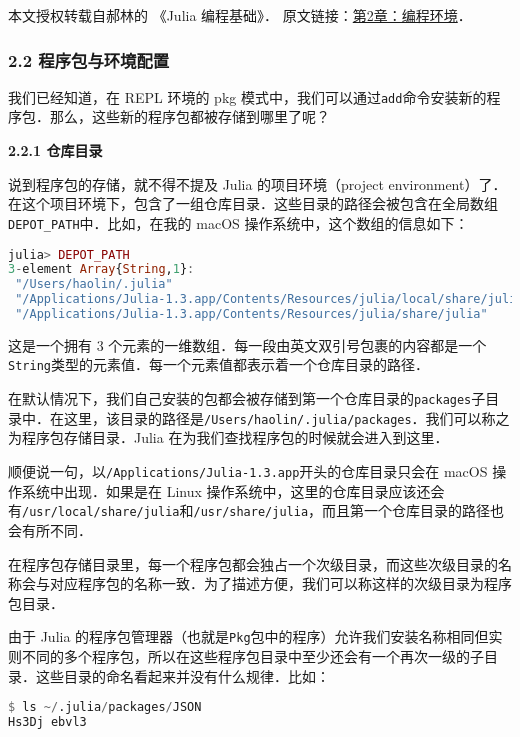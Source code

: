 
本文授权转载自郝林的 《Julia 编程基础》． 原文链接：\href{https://github.com/hyper0x/JuliaBasics/blob/master/book/ch02.md}{第2章：编程环境}．


\subsubsection{2.2 程序包与环境配置}

我们已经知道，在 REPL 环境的 pkg 模式中，我们可以通过\verb|add|命令安装新的程序包．那么，这些新的程序包都被存储到哪里了呢？

\textbf{2.2.1 仓库目录}

说到程序包的存储，就不得不提及 Julia 的项目环境（project environment）了．在这个项目环境下，包含了一组仓库目录．这些目录的路径会被包含在全局数组\verb|DEPOT_PATH|中．比如，在我的 macOS 操作系统中，这个数组的信息如下：

\begin{lstlisting}[language=julia]
julia> DEPOT_PATH
3-element Array{String,1}:
 "/Users/haolin/.julia"                                                  
 "/Applications/Julia-1.3.app/Contents/Resources/julia/local/share/julia"
 "/Applications/Julia-1.3.app/Contents/Resources/julia/share/julia" 
\end{lstlisting}

这是一个拥有 3 个元素的一维数组．每一段由英文双引号包裹的内容都是一个\verb|String|类型的元素值．每一个元素值都表示着一个仓库目录的路径．

在默认情况下，我们自己安装的包都会被存储到第一个仓库目录的\verb|packages|子目录中．在这里，该目录的路径是\verb|/Users/haolin/.julia/packages|．我们可以称之为程序包存储目录．Julia 在为我们查找程序包的时候就会进入到这里．

顺便说一句，以\verb|/Applications/Julia-1.3.app|开头的仓库目录只会在 macOS 操作系统中出现．如果是在 Linux 操作系统中，这里的仓库目录应该还会有\verb|/usr/local/share/julia|和\verb|/usr/share/julia|，而且第一个仓库目录的路径也会有所不同．

在程序包存储目录里，每一个程序包都会独占一个次级目录，而这些次级目录的名称会与对应程序包的名称一致．为了描述方便，我们可以称这样的次级目录为程序包目录．

由于 Julia 的程序包管理器（也就是\verb|Pkg|包中的程序）允许我们安装名称相同但实则不同的多个程序包，所以在这些程序包目录中至少还会有一个再次一级的子目录．这些目录的命名看起来并没有什么规律．比如：

\begin{lstlisting}[language=julia]
$ ls ~/.julia/packages/JSON
Hs3Dj ebvl3
\end{lstlisting}

